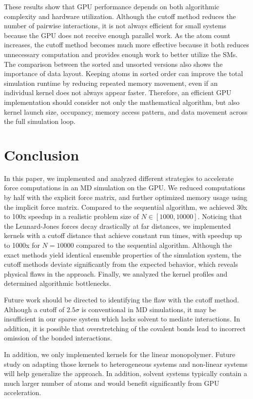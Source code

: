 \documentclass[12pt]{article}
\begin{document}
These results show that GPU performance depends on both algorithmic complexity and hardware utilization. Although the cutoff method reduces the number of pairwise interactions, it is not always efficient for small systems because the GPU does not receive enough parallel work. As the atom count increases, the cutoff method becomes much more effective because it both reduces unnecessary computation and provides enough work to better utilize the SMs. The comparison between the sorted and unsorted versions also shows the importance of data layout. Keeping atoms in sorted order can improve the total simulation runtime by reducing repeated memory movement, even if an individual kernel does not always appear faster. Therefore, an efficient GPU implementation should consider not only the mathematical algorithm, but also kernel launch size, occupancy, memory access pattern, and data movement across the full simulation loop.

\section{Conclusion}
In this paper, we implemented and analyzed different strategies to accelerate force computations in an MD simulation on the GPU. We reduced computations by half with the explicit force matrix, and further optimized memory usage using the implicit force matrix. Compared to the sequential algorithm, we achieved 30x to 100x speedup in a realistic problem size of $N\in [1000,10000]$. Noticing that the Lennard-Jones forces decay drastically at far distances, we implemented kernels with a cutoff distance that achieve constant run times, with speedup up to 1000x for $N=10000$ compared to the sequential algorithm. Although the exact methods yield identical ensemble properties of the simulation system, the cutoff methods deviate significantly from the expected behavior, which reveals physical flaws in the approach. Finally, we analyzed the kernel profiles and determined algorithmic bottlenecks.

Future work should be directed to identifying the flaw with the cutoff method. Although a cutoff of $2.5\sigma$ is conventional in MD simulations, it may be insufficient in our sparse system which lacks solvent to mediate interactions. In addition, it is possible that overstretching of the covalent bonds lead to incorrect omission of the bonded interactions.

In addition, we only implemented kernels for the linear monopolymer. Future study on adapting those kernels to heterogeneous systems and non-linear systems will help generalize the approach. In addition, solvent systems typically contain a much larger number of atoms and would benefit significantly from GPU acceleration.
\end{document}
